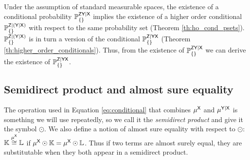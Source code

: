 Under the assumption of standard measurable spaces, the existence of a conditional probability $\mathbb{P}_{\{\}}^{\mathsf{ZY}|\mathsf{X}}$ implies the existence of a higher order conditional $\mathbb{P}_{\{\}}^{\mathsf{Z}|(\mathsf{Y}|\mathsf{X})}$ with respect to the same probability set (Theorem \ref{th:ho_cond_psets}). $\mathbb{P}_{\{\}}^{\mathsf{Z}|(\mathsf{Y}|\mathsf{X})}$ is in turn a version of the conditional $\mathbb{P}_{\{\}}^{\mathsf{Z}|\mathsf{YX}}$ (Theorem \ref{th:higher_order_conditionals}). Thus, from the existence of $\mathbb{P}_{\{\}}^{\mathsf{ZY}|\mathsf{X}}$ we can derive the existence of $\mathbb{P}_{\{\}}^{\mathsf{Z}|\mathsf{YX}}$.



\subsection{Semidirect product and almost sure equality}

The operation used in Equation \ref{eq:conditional} that combines $\mu^{\mathsf{X}}$ and $\mu^{\mathsf{Y}|\mathsf{X}}$ is something we will use repeatedly, so we call it the \emph{semidirect product} and give it the symbol $\odot$. We also define a notion of almost sure equality with respect to $\odot$: $\mathbb{K}\overset{\mu^{\mathsf{X}}}{\cong} \mathbb{L}$ if $\mu^{\mathsf{X}}\odot \mathbb{K}=\mu^{\mathsf{X}}\odot\mathbb{L}$. Thus if two terms are almost surely equal, they are substitutable when they both appear in a semidirect product.

